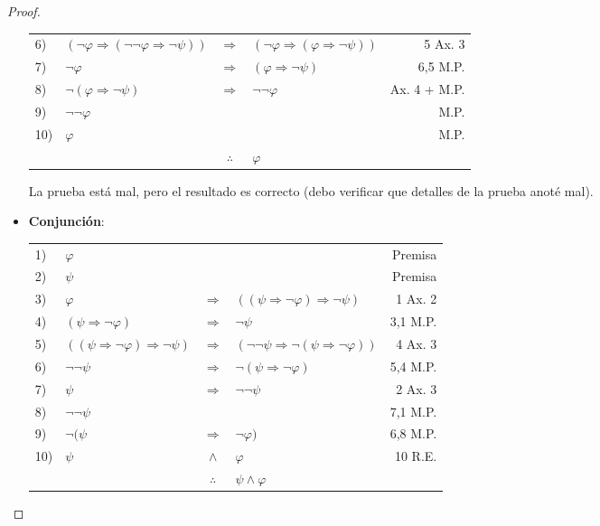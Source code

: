 \documentclass[12pt]{report}
\newcounter{it}
\theoremstyle{largebreak}
\begin{document}
\begin{proof}
\begin{itemize}
\begin{center}
\begin{tabular}{l l c l r}
                    6) & $(\neg\varphi\Rightarrow(\neg\neg\varphi\Rightarrow\neg\psi))$ & $\Rightarrow$ & $(\neg\varphi\Rightarrow(\varphi\Rightarrow\neg\psi))$ &  5 Ax. 3 \\
                    7) & $\neg\varphi$ & $\Rightarrow$ & $(\varphi\Rightarrow\neg\psi)$ &  6,5 M.P. \\
                    8) & $\neg(\varphi\Rightarrow\neg\psi)$ & $\Rightarrow$ & $\neg\neg\varphi$ &  Ax. 4 + M.P. \\
                    9) & $\neg\neg\varphi$ &  &  &  M.P. \\
                    10) & $\varphi$ &  &  &  M.P. \\
                    \hline
                    & & $\therefore$ & $\varphi$ & \\
                \end{tabular}
            \end{center}
            La prueba está mal, pero el resultado es correcto (debo verificar que detalles de la prueba anoté mal).
            \item \textbf{Conjunción}:
            \begin{center}
                \begin{tabular}{l l c l r}
                    1) & $\varphi$ &  &  & Premisa \\
                    2) & $\psi$ &  &  & Premisa \\
                    3) & $\varphi$ & $\Rightarrow$ & $((\psi\Rightarrow\neg\varphi)\Rightarrow\neg\psi)$ & 1 Ax. 2 \\
                    4) & $(\psi\Rightarrow\neg\varphi)$ & $\Rightarrow$ & $\neg\psi$ & 3,1 M.P. \\
                    5) & $((\psi\Rightarrow\neg\varphi)\Rightarrow\neg\psi)$ & $\Rightarrow$ & $(\neg\neg\psi\Rightarrow\neg(\psi\Rightarrow\neg\varphi))$ & 4 Ax. 3\\
                    6) & $\neg\neg\psi$ & $\Rightarrow$ & $\neg(\psi\Rightarrow\neg\varphi)$ & 5,4 M.P.\\
                    7) & $\psi$ & $\Rightarrow$ & $\neg\neg\psi$ & 2 Ax. 3\\
                    8) & $\neg\neg\psi$ &  &  & 7,1 M.P.\\
                    9) & $\neg(\psi$ & $\Rightarrow$ & $\neg\varphi)$ & 6,8 M.P.\\
                    10) & $\psi$ & $\land$ & $\varphi$ & 10 R.E.\\
                    \hline
                    & & $\therefore$ & $\psi\land\varphi$ & \\
                \end{tabular}
            \end{center}
        \end{itemize}
    \end{proof}
\end{document}
